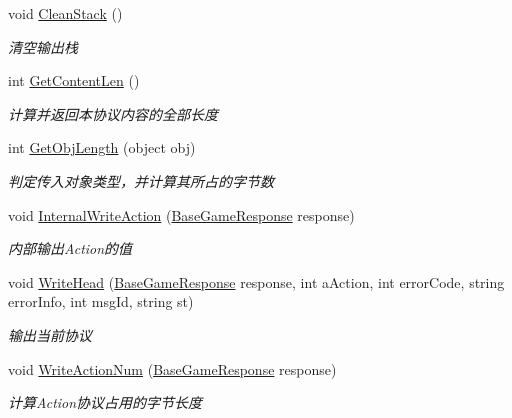 \begin{DoxyCompactItemize}
\item 
void \mbox{\hyperlink{class_t_net_1_1_service_1_1_data_struct_a7ec2ede62a52b2f67db5a2310af7651d}{Clean\+Stack}} ()
\begin{DoxyCompactList}\small\item\em 清空输出栈 \end{DoxyCompactList}\item 
int \mbox{\hyperlink{class_t_net_1_1_service_1_1_data_struct_aa0b1cd4aebe731bcec883645a62427c5}{Get\+Content\+Len}} ()
\begin{DoxyCompactList}\small\item\em 计算并返回本协议内容的全部长度 \end{DoxyCompactList}\item 
int \mbox{\hyperlink{class_t_net_1_1_service_1_1_data_struct_a6ba31ed446da27f6ef4851f07f95c07c}{Get\+Obj\+Length}} (object obj)
\begin{DoxyCompactList}\small\item\em 判定传入对象类型，并计算其所占的字节数 \end{DoxyCompactList}\item 
void \mbox{\hyperlink{class_t_net_1_1_service_1_1_data_struct_ac28f6a22a99fedca43929d310599f012}{Internal\+Write\+Action}} (\mbox{\hyperlink{class_t_net_1_1_service_1_1_base_game_response}{Base\+Game\+Response}} response)
\begin{DoxyCompactList}\small\item\em 内部输出\+Action的值 \end{DoxyCompactList}\item 
void \mbox{\hyperlink{class_t_net_1_1_service_1_1_data_struct_ae3bae60115f855029d3f60687480c9f5}{Write\+Head}} (\mbox{\hyperlink{class_t_net_1_1_service_1_1_base_game_response}{Base\+Game\+Response}} response, int a\+Action, int error\+Code, string error\+Info, int msg\+Id, string st)
\begin{DoxyCompactList}\small\item\em 输出当前协议 \end{DoxyCompactList}\item 
void \mbox{\hyperlink{class_t_net_1_1_service_1_1_data_struct_a65f82384b46aad6764fd5d5c6b794ba0}{Write\+Action\+Num}} (\mbox{\hyperlink{class_t_net_1_1_service_1_1_base_game_response}{Base\+Game\+Response}} response)
\begin{DoxyCompactList}\small\item\em 计算\+Action协议占用的字节长度 \end{DoxyCompactList}\end{DoxyCompactItemize}
